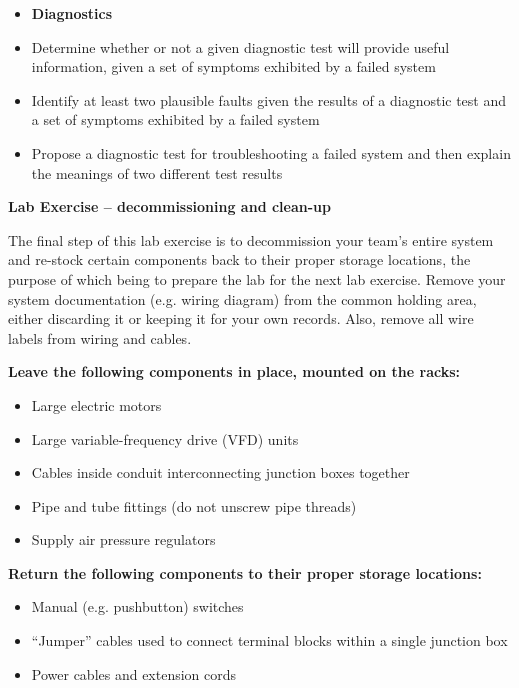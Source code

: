 \filbreak

\begin{itemize}
\item{} {\bf Diagnostics}
\item{} Determine whether or not a given diagnostic test will provide useful information, given a set of symptoms exhibited by a failed system
\item{} Identify at least two plausible faults given the results of a diagnostic test and a set of symptoms exhibited by a failed system
\item{} Propose a diagnostic test for troubleshooting a failed system and then explain the meanings of two different test results
\end{itemize}


\vfil \eject

\noindent
{\bf Lab Exercise -- decommissioning and clean-up}

\vskip 5pt

The final step of this lab exercise is to decommission your team's entire system and re-stock certain components back to their proper storage locations, the purpose of which being to prepare the lab for the next lab exercise.  Remove your system documentation (e.g. wiring diagram) from the common holding area, either discarding it or keeping it for your own records.  Also, remove all wire labels from wiring and cables.

\vskip 10pt

\indent
{\bf Leave the following components in place, mounted on the racks:}

\begin{itemize}
\item{} Large electric motors
\item{} Large variable-frequency drive (VFD) units
\item{} Cables inside conduit interconnecting junction boxes together
\item{} Pipe and tube fittings (do not unscrew pipe threads)
\item{} Supply air pressure regulators
\end{itemize}

\vskip 10pt

\indent
{\bf Return the following components to their proper storage locations:}

\begin{itemize}
\item{} Manual (e.g. pushbutton) switches
\item{} ``Jumper'' cables used to connect terminal blocks within a single junction box
\item{} Power cables and extension cords
\end{itemize}













